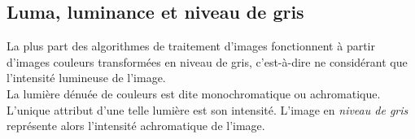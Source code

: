 \documentclass[a4paper,12pt]{report}
\begin{document}
%
\subsection{Luma, luminance et niveau de gris}
La plus part des algorithmes de traitement d'images fonctionnent à partir d'images couleurs transformées en niveau de gris, c'est-à-dire ne considérant que l'intensité lumineuse de l'image.\\
 
La lumière dénuée de couleurs est dite monochromatique ou achromatique. L'unique attribut d'une telle lumière est son intensité. L'image en \textit{niveau de gris} représente alors l'intensité achromatique de l'image.\\ 
\end{document}
